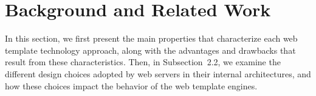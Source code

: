 \chapter{Background and Related Work}

In this section, we first present the main properties that characterize each web
template technology approach, along with the advantages and drawbacks that result
from these characteristics. Then, in Subsection~2.2, we examine the different
design choices adopted by web servers in their internal architectures, and how
these choices impact the behavior of the web template engines.



